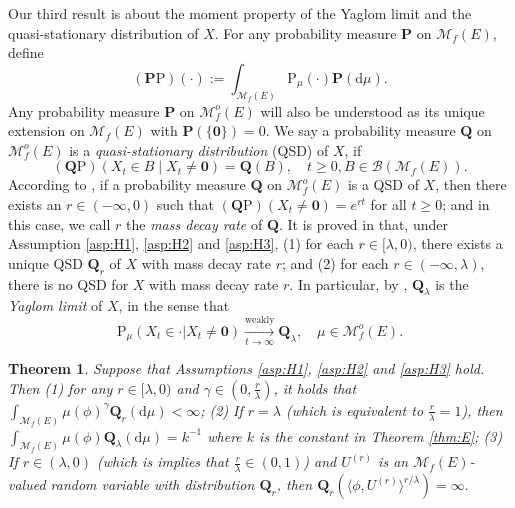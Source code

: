 \documentclass[12pt,a4paper]{amsart}
\numberwithin{equation}{section}
\theoremstyle{plain}
\newtheorem{thm}{Theorem}[section]
\theoremstyle{definition}
\theoremstyle{remark}
\begin{document}
	Our third result is about the moment property of the Yaglom limit and the quasi-stationary distribution of $X$.
	For any probability measure $\mathbf P$ on $\mathcal M_f(E)$, define
\[
	(\mathbf P\mathrm P)(\cdot)
	:= \int_{\mathcal M_f(E)} \mathrm P_\mu(\cdot)\mathbf P({\mathrm d}\mu).
\]
	Any probability measure $\mathbf P$ on $\mathcal M_f^o(E)$ will also be understood as its unique extension on $\mathcal M_f(E)$ with  $\mathbf P(\{\mathbf 0\}) = 0$.
 We say a probability measure $\mathbf Q$ on $\mathcal M^o_f(E)$ is a \emph{quasi-stationary distribution} (QSD) of $X$, if
\[
	(\mathbf Q \mathrm P) \left( X_t \in B \middle | X_t \neq \mathbf 0 \right)
	= \mathbf Q(B),
	\quad t\geq 0, B \in \mathcal B(\mathcal M_f(E)).
\]
	According to \cite[(1.5)]{LiuRenSongSun2020}, if a probability measure $\mathbf Q$ on $\mathcal M_f^o(E)$ is a QSD of $X$, then there exists an $r\in (-\infty, 0)$ such that $(\mathbf Q\mathrm P)(X_t \neq \mathbf 0) = e^{rt}$ for all $t\geq 0$; and in this case, we call $r$ the \emph{mass decay rate} of $\mathbf Q$.
	It is proved in \cite[Theorem 1.2]{LiuRenSongSun2020} that, under Assumption \eqref{asp:H1}, \eqref{asp:H2} and \eqref{asp:H3},
	(1) for each $r\in [\lambda, 0)$, there exists a unique QSD $\mathbf Q_r$ of $X$ with mass decay rate $r$;
	and (2) for each $r\in (-\infty, \lambda)$, there is no QSD for $X$ with mass decay rate $r$.
	In particular, by \cite[Theorem 1.1, Proposition 1.7]{LiuRenSongSun2020}, $\mathbf Q_\lambda$ is the \emph{Yaglom limit} of $X$, in the sense that
\begin{equation}
	\mathrm P_\mu(X_t \in \cdot | X_t \neq \mathbf 0)
	\xrightarrow[t\to \infty]{\text{weakly}} \mathbf Q_\lambda,
	\quad \mu \in \mathcal M_f^o(E).
\end{equation}

\begin{thm}\label{thm:L}
	Suppose that Assumptions \eqref{asp:H1}, \eqref{asp:H2} and \eqref{asp:H3} hold.
	Then (1)
	for any $r\in [\lambda, 0)$ and $\gamma \in (0, \frac{r}{\lambda})$, it holds that $\int_{{\mathcal M}_f(E)}\mu(\phi)^\gamma\mathbf Q_r({\mathrm d}\mu)<\infty$;
	(2) If $r=\lambda$ (which is equivalent to $\frac{r}{\lambda}=1$), then $\int_{{\mathcal M}_f(E)}\mu(\phi)\mathbf Q_\lambda({\mathrm d}\mu) = k^{-1}$ where $k$ is  the constant in Theorem \ref{thm:E};
	(3) If $r\in (\lambda, 0)$ 
	(which is implies that $\frac{r}{\lambda}\in(0,1)$) and $U^{(r)}$ is an $\mathcal M_f(E)$-valued random variable with distribution $ \mathbf Q_r$, then $ \mathbf Q_r(\langle\phi, U^{(r)}\rangle^{r/\lambda})=\infty.$
\end{thm}
\end{document}
